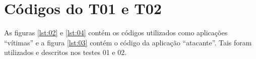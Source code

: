 \documentclass[conference]{IEEEtran}
\begin{document}



\appendices
\section{Códigos do T01 e T02}
\label{appendix:a}
As figuras \ref{lst:02} e \ref{lst:04} contém os códigos utilizados como aplicações ``vítimas'' e a figura \ref{lst:03} contém o código da aplicação ``atacante''. Tais foram utilizados e descritos nos testes 01 e 02.



\end{document}

